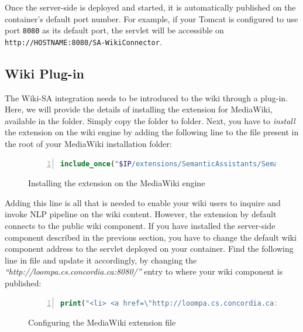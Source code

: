 Once the server-side is deployed and started, it is automatically published on the container's default port number. For example, if your Tomcat is configured to use port \texttt{8080} as its default port, the servlet will be accessible on \texttt{http://HOSTNAME:8080/SA-WikiConnector}.

\subsection{Wiki Plug-in}
The Wiki-SA integration needs to be introduced to the wiki through a plug-in. Here, we will provide the details of installing the \sa extension for MediaWiki, available in the  folder. Simply copy the \texttt{\sa} folder to  folder. Next, you have to \emph{install} the extension on the wiki engine by adding the following line to the  file present in the root of your MediaWiki installation folder:

\begin{figure}[h!]
\centering
\begin{lstlisting}[language=PHP,numbers=left,xleftmargin=4mm,columns=flexible]
include_once("$IP/extensions/SemanticAssistants/SemanticAssistants.php");
\end{lstlisting}
\caption{Installing the \sa extension on the MediaWiki engine}
\label{list:mediawiki_sa_extension_install}
\end{figure}

Adding this line is all that is needed to enable your wiki users to inquire and invoke NLP pipeline on the wiki content. However, the extension by default connects to the public \sa wiki component. If you have installed the server-side component described in the previous section, you have to change the default wiki component address to the servlet deployed on your container. Find the following line in  file and update it accordingly, by changing the \emph{``http://loompa.cs.concordia.ca:8080/''} entry to where your wiki component is published:

\begin{figure}[h!]
\centering
\begin{lstlisting}[language=PHP,numbers=left,xleftmargin=4mm,columns=flexible]
print("<li> <a href=\"http://loompa.cs.concordia.ca:8080/SA-WikiConnector/SemAssistServlet?action=proxy\">Semantic Assistants</a></li>");\end{lstlisting}
\caption{Configuring the \sa MediaWiki extension file}
\label{list:mediawiki_sa_extension_config}
\end{figure}

